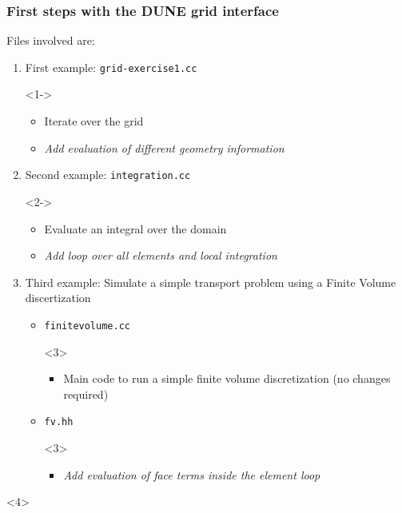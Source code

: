 \documentclass[aspectratio=169,11pt]{beamer}
\theoremstyle{definition}
\begin{document}
\begin{frame}
\frametitle{First steps with the DUNE grid interface}
Files involved are:
\begin{enumerate}[1)]
\item First example: \lstinline{grid-exercise1.cc}
  \begin{uncoverenv}<1->
    \begin{itemize}
    \item Iterate over the grid
    \item \emph{Add evaluation of different geometry information}
    \end{itemize}
  \end{uncoverenv}
\item Second example: \lstinline{integration.cc}
  \begin{uncoverenv}<2->
    \begin{itemize}
    \item Evaluate an integral over the domain
    \item \emph{Add loop over all elements and local integration}
    \end{itemize}
  \end{uncoverenv}
\item Third example: Simulate a simple transport problem using a
  Finite Volume discertization\\
  \begin{itemize}
  \item \lstinline{finitevolume.cc}
  \begin{uncoverenv}<3>
    \begin{itemize}
    \item Main code to run a simple finite volume discretization (no
      changes required)
    \end{itemize}
  \end{uncoverenv}
\item \lstinline{fv.hh}
  \begin{uncoverenv}<3>
    \begin{itemize}
    \item \emph{Add evaluation of face terms inside the element loop}
    \end{itemize}
  \end{uncoverenv}
  \end{itemize}
\end{enumerate}
\begin{uncoverenv}<4>
\end{uncoverenv}
\end{frame}
\end{document}
